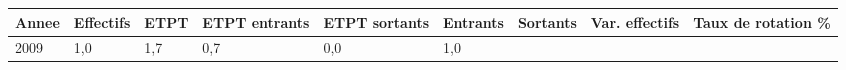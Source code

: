 \begin{longtable}[]{@{}lllllllll@{}}
\toprule
\begin{minipage}[b]{0.05\columnwidth}\raggedright
Annee\strut
\end{minipage} & \begin{minipage}[b]{0.08\columnwidth}\raggedright
Effectifs\strut
\end{minipage} & \begin{minipage}[b]{0.04\columnwidth}\raggedright
ETPT\strut
\end{minipage} & \begin{minipage}[b]{0.10\columnwidth}\raggedright
ETPT entrants\strut
\end{minipage} & \begin{minipage}[b]{0.10\columnwidth}\raggedright
ETPT sortants\strut
\end{minipage} & \begin{minipage}[b]{0.07\columnwidth}\raggedright
Entrants\strut
\end{minipage} & \begin{minipage}[b]{0.07\columnwidth}\raggedright
Sortants\strut
\end{minipage} & \begin{minipage}[b]{0.11\columnwidth}\raggedright
Var. effectifs\strut
\end{minipage} & \begin{minipage}[b]{0.14\columnwidth}\raggedright
Taux de rotation \%\strut
\end{minipage}\tabularnewline
\midrule
\endhead
\begin{minipage}[t]{0.05\columnwidth}\raggedright
2009\strut
\end{minipage} & \begin{minipage}[t]{0.08\columnwidth}\raggedright
1,0\strut
\end{minipage} & \begin{minipage}[t]{0.04\columnwidth}\raggedright
1,7\strut
\end{minipage} & \begin{minipage}[t]{0.10\columnwidth}\raggedright
0,7\strut
\end{minipage} & \begin{minipage}[t]{0.10\columnwidth}\raggedright
0,0\strut
\end{minipage} & \begin{minipage}[t]{0.07\columnwidth}\raggedright
1,0\strut
\end{minipage} & \begin{minipage}[t]{0.07\columnwidth}\raggedright

\end{minipage}
\end{longtable}
